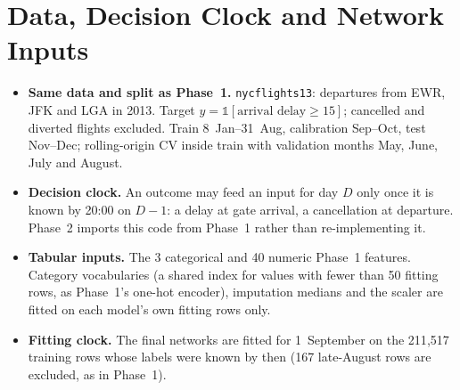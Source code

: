 \documentclass[conference]{IEEEtran}
\begin{document}
\section{Data, Decision Clock and Network Inputs}\label{sec:data}
\begin{itemize}
\item \textbf{Same data and split as Phase~1.} \texttt{nycflights13}: departures from EWR, JFK and LGA in 2013. Target $y=\mathbb{1}[\text{arrival delay}\ge 15]$; cancelled and diverted flights excluded. Train 8~Jan--31~Aug, calibration Sep--Oct, test Nov--Dec; rolling-origin CV inside train with validation months May, June, July and August.
\item \textbf{Decision clock.} An outcome may feed an input for day $D$ only once it is known by 20:00 on $D-1$: a delay at gate arrival, a cancellation at departure. Phase~2 imports this code from Phase~1 rather than re-implementing it.
\item \textbf{Tabular inputs.} The 3 categorical and 40 numeric Phase~1 features. Category vocabularies (a shared index for values with fewer than 50 fitting rows, as Phase~1's one-hot encoder), imputation medians and the scaler are fitted on each model's own fitting rows only.
\item \textbf{Fitting clock.} The final networks are fitted for 1~September on the 211{,}517 training rows whose labels were known by then (167 late-August rows are excluded, as in Phase~1).
\end{itemize}

\end{document}
